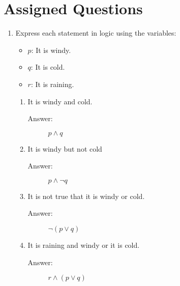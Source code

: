 \documentclass[12pt, oneside]{article}
\begin{document}
\section*{Assigned Questions}
\begin{enumerate}

\item Express each statement in logic using the variables: 
\begin{itemize}
    \item $p$: It is windy.
    \item $q$: It is cold.
    \item $r$: It is raining.
\end{itemize}

\begin{enumerate}
    \item It is windy and cold.
    \begin{description}
        \item[Answer:] $p\land q$
    \end{description}
    \item It is windy but not cold\
    \begin{description}
        \item[Answer:] $p\land \lnot q$
    \end{description}
    \item It is not true that it is windy or cold.
    \begin{description}
        \item[Answer:] $\lnot (p\lor q)$
    \end{description}
    \item It is raining and windy or it is cold.
    \begin{description}
        \item[Answer:] $r\land (p\lor q)$
    \end{description}

\end{enumerate}


\end{enumerate}
\end{document}

